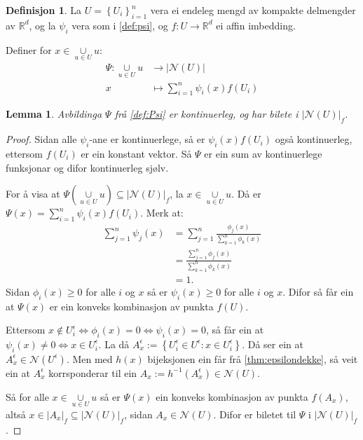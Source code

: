 \documentclass[a4paper, 12pt, norsk]{article}
\theoremstyle{plain}
\newtheorem{lemma}[theorem]{Lemma}
\theoremstyle{definition}
\newtheorem{definition}[theorem]{Definisjon}
\newcommand{\Rb}{\mathbb{R}}
\newcommand{\Nc}{\mathcal{N}}
\newcommand{\union}{ \mathop{\cup}\limits }
\newcommand{\gr}[1]{ \lvert #1 \rvert } %
\newcommand{\set}[1]{ \left\{ #1 \right\} } %
\newcommand{\tuple}[1]{ \left( #1 \right) } %
\begin{document}
\begin{definition} \label{def:Psi}
	La \( U = \set{U_i}_{i=1}^n \) vera ei endeleg mengd av kompakte delmengder av \( \Rb^d \), og la \( \psi_i \) vera som i \autoref{def:psi}, og \( f: U \to \Rb^d \) ei affin imbedding. 
	
	Definer for \( x \in \union_{u \in U} u \):
	\begin{align*}
		\Psi : \union_{u \in U} u &\to \gr{\Nc(U)} \\
		x &\mapsto \sum_{i=1}^n \psi_i(x)f(U_i)
	\end{align*}
\end{definition}

\begin{lemma} \label{thm:psi-kont}
	Avbildinga \( \Psi \) frå \autoref{def:Psi} er kontinuerleg, og har bilete i \( \gr{\Nc(U)}_f \).
\end{lemma}

\begin{proof}
	Sidan alle \( \psi_i \)-ane er kontinuerlege, så er \( \psi_i(x) f(U_i) \) også kontinuerleg, ettersom \( f(U_i) \) er ein konstant vektor. Så \( \Psi \) er ein sum av kontinuerlege funksjonar og difor kontinuerleg sjølv.

	For å visa at \( \Psi\tuple{\union_{u \in U} u} \subseteq \gr{\Nc(U)}_f \), la \( x \in \union_{u \in U} u \). Då er \( \Psi(x) = \sum_{i=1}^n \psi_i(x)f(U_i) \). Merk at:
	\begin{align*}
		\sum_{j=1}^n \psi_j(x)  &= \sum_{j=1}^n \frac{\phi_j(x)}{\sum_{k=1}^n \phi_k(x)} \\
		&= \frac{\sum_{j=1}^n \phi_j(x)}{\sum_{k=1}^n \phi_k(x)} \\
		&= 1.
	\end{align*}
	Sidan \( \phi_i(x) \geq 0 \) for alle \( i \) og \( x \) så er \( \psi_i(x) \geq 0 \) for alle \( i \) og \( x \). Difor så får ein at \( \Psi(x) \) er ein konveks kombinasjon av punkta \( f(U) \).

	Ettersom \( x \not\in U_i^\epsilon \iff \phi_i(x) = 0 \iff \psi_i(x) = 0 \), så får ein at \( \psi_i(x) \neq 0 \iff x \in U_i^\epsilon \). La då \( A_x^\epsilon := \set{U_i^\epsilon \in U^\epsilon : x \in U_i^\epsilon} \). Då ser ein at \( A_x^\epsilon \in \Nc(U^\epsilon) \). Men med \( h(x) \) bijeksjonen ein får frå \autoref{thm:epsilondekke}, så veit ein at \( A_x^\epsilon \) korrsponderar til ein \( A_x := h^{-1}(A_x^\epsilon) \in \Nc(U) \).
	
	Så for alle \( x \in \union_{u \in U} u \) så er \( \Psi(x) \) ein konveks kombinasjon av punkta \( f(A_x) \), altså \( x \in \gr{A_x}_f \subseteq \gr{\Nc(U)}_f \), sidan \( A_x \in \Nc(U) \). Difor er biletet til \( \Psi \) i \( \gr{\Nc(U)}_f \).
\end{proof}
\end{document}
